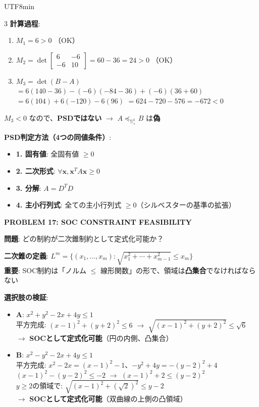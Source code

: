 \documentclass[8pt,a4paper]{article}
\newcommand{\mysection}[1]{\vspace{2pt}\textbf{#1}\vspace{1pt}}
\begin{document}
\begin{CJK}{UTF8}{min}
\begin{multicols}{3}
\textbf{計算過程}:
\begin{enumerate}
    \item $M_1 = 6 > 0$ （OK）
    \item $M_2 = \det \begin{bmatrix} 6 & -6 \\ -6 & 10 \end{bmatrix} = 60 - 36 = 24 > 0$ （OK）
    \item $M_3 = \det(B-A)$
    $= 6(140 - 36) - (-6)(-84 - 36) + (-6)(36 + 60)$
    $= 6(104) + 6(-120) - 6(96)$
    $= 624 - 720 - 576 = -672 < 0$
\end{enumerate}
$M_3 < 0$ なので、\textbf{PSDではない} $\to$ $A \preceq_{\mathbb{S}_+^3} B$ は\textbf{偽}

\textbf{PSD判定方法（4つの同値条件）}:
\begin{itemize}
    \item \textbf{1. 固有値}: 全固有値 $\geq 0$
    \item \textbf{2. 二次形式}: $\forall \boldsymbol{x}, \boldsymbol{x}^T A \boldsymbol{x} \geq 0$
    \item \textbf{3. 分解}: $A = D^T D$
    \item \textbf{4. 主小行列式}: 全ての主小行列式 $\geq 0$（シルベスターの基準の拡張）
\end{itemize}

\mysection{PROBLEM 17: SOC CONSTRAINT FEASIBILITY}

\textbf{問題}: どの制約が二次錐制約として定式化可能か？

\textbf{二次錐の定義}: $L^m = \{(x_1,\ldots,x_m): \sqrt{x_1^2+\cdots+x_{m-1}^2} \leq x_m\}$\\
\textbf{重要}: SOC制約は「ノルム $\leq$ 線形関数」の形で、領域は\textbf{凸集合}でなければならない

\textbf{選択肢の検証}:
\begin{itemize}
    \item \textbf{A}: $x^2+y^2-2x+4y \leq 1$\\
    平方完成: $(x-1)^2+(y+2)^2 \leq 6$ $\to$ $\sqrt{(x-1)^2+(y+2)^2} \leq \sqrt{6}$\\
    $\to$ \textbf{SOCとして定式化可能}（円の内側、凸集合）
    
    \item \textbf{B}: $x^2-y^2-2x+4y \leq 1$\\
    平方完成: $x^2-2x = (x-1)^2-1$、$-y^2+4y = -(y-2)^2+4$\\
    $(x-1)^2 - (y-2)^2 \leq -2$ $\to$ $(x-1)^2 + 2 \leq (y-2)^2$\\
    $y \geq 2$の領域で: $\sqrt{(x-1)^2 + (\sqrt{2})^2} \leq y-2$\\
    $\to$ \textbf{SOCとして定式化可能}（双曲線の上側の凸領域）
    

\end{itemize}
\end{multicols}
\end{CJK}
\end{document}
